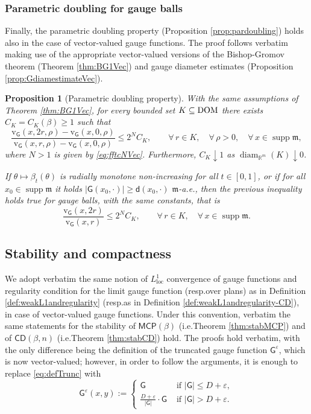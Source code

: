 \documentclass[11pt,a4paper]{article}
\theoremstyle{plain}
\newtheorem{proposition}[theorem]{Proposition}
\theoremstyle{definition}
\theoremstyle{remark}
\numberwithin{equation}{section}
\newcommand{\R}{\mathbb{R}} %
\newcommand{\DOM}{{\rm{DOM}}}
\DeclareMathOperator{\supp}{\mathrm{supp}}
\newcommand{\ve}{\varepsilon}
\newcommand{\CD}{\mathsf{CD}}
\newcommand{\MCP}{\mathsf{MCP}}
\newcommand{\rv}{\mathrm{v}}
\newcommand{\loc}{\mathrm{loc}}
\DeclareMathOperator{\diam}{\mathrm{diam}}
\newcommand{\mm}{\mathfrak m}
\newcommand{\sfd}{\mathsf d}
\newcommand{\sfG}{\mathsf G}
\begin{document}
\subsubsection*{Parametric doubling for gauge balls}
 
Finally, the parametric doubling property (Proposition \ref{prop:pardoubling}) holds also in the case of vector-valued gauge functions. The proof follows verbatim making use of the appropriate vector-valued versions of the Bishop-Gromov theorem (Theorem \ref{thm:BG1Vec}) and gauge diameter estimates (Proposition \ref{prop:GdiamestimateVec}).
\begin{proposition}[Parametric doubling property]\label{prop:pardoublingVec}
With the same assumptions of Theorem \ref{thm:BG1Vec}, for every bounded set $K\subseteq\DOM$ there exists $C_K=C_K(\beta)\geq 1$ such that
\begin{equation}
\frac{\rv_{\sfG}(x, 2r,\rho)-\rv_{\sfG}(x,0,\rho)}{\rv_{\sfG}(x, r,\rho)-\rv_{\sfG}(x,0,\rho)}\leq  2^N C_K, \qquad \forall\, r \in K,\quad\forall\, \rho>0, \quad \forall\, x\in \supp\mm,
\end{equation}
where $N>1$ is given by \eqref{eq:fftcNVec}. Furthermore, $C_K \downarrow 1$ as $\diam_{\R^m}(K)\downarrow 0$.

If $\theta\mapsto \beta_t(\theta)$ is radially monotone non-increasing for all $t\in [0,1]$, or if for all $x_0\in\supp\mm$ it holds $|\sfG(x_0,\cdot)| \geq \sfd(x_0,\cdot)$ $\mm$-a.e., then the previous inequality holds true for gauge balls, with the same constants, that is
\begin{equation}
\frac{\rv_{\sfG}(x, 2r)}{\rv_{\sfG}(x, r)}\leq  2^N C_{K}, \qquad \forall\, r\in K, \quad \forall\, x\in \supp\mm.
\end{equation}
\end{proposition}


\subsection{Stability and compactness}

We adopt verbatim the same notion of $L^1_{\loc}$ convergence of gauge functions and regularity condition for the limit gauge function (resp.\@ over plans) as in Definition \ref{def:weakL1andregularity} (resp.\@ as in Definition  \ref{def:weakL1andregularity-CD}), in case of vector-valued gauge functions.
Under this convention, verbatim the same statements for the stability of $\MCP(\beta)$ (i.e.\@ Theorem \ref{thm:stabMCP}) and of $\CD(\beta,n)$ (i.e.\@ Theorem \ref{thm:stabCD}) hold. The proofs hold verbatim, with the only difference being the definition of the truncated gauge function $\sfG^{\ve}$, which is now vector-valued; however, in order to follow the arguments, it is enough to replace \eqref{eq:defTrunc} with 
\begin{equation}\label{eq:defTruncGVec}
\sfG^{\ve}(x,y):=
\begin{cases}
 \sfG & \text{ if } |\sfG|\leq D+\ve, \\
 \frac{D+\ve}{|\sfG|} \cdot \sfG  & \text{ if } |\sfG|>D+\ve.
\end{cases}
\end{equation}
\end{document}
